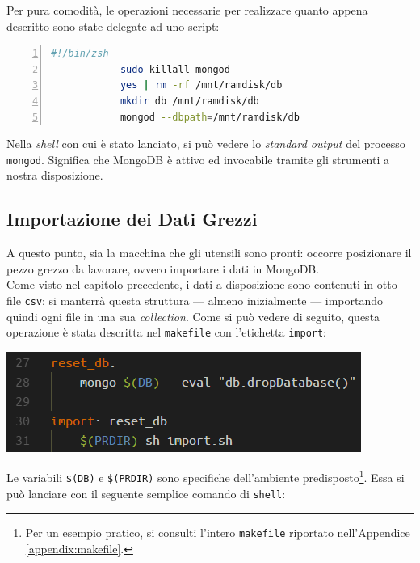 		Per pura comodità, le operazioni necessarie per realizzare quanto appena descritto sono state delegate ad uno script:

		\begin{lstlisting}[language=bash,caption={script di lancio di un server MongoDB}, numbers=left, stepnumber=1]
			#!/bin/zsh
			sudo killall mongod
			yes | rm -rf /mnt/ramdisk/db
			mkdir db /mnt/ramdisk/db
			mongod --dbpath=/mnt/ramdisk/db
		\end{lstlisting}

		\vspace{0.3cm}

		Nella \textit{shell} con cui è stato lanciato, si può vedere lo \textit{standard output} del processo \texttt{mongod}. Significa che MongoDB è attivo ed invocabile tramite gli strumenti a nostra disposizione.

	\subsection{Importazione dei Dati Grezzi}

		A questo punto, sia la macchina che gli utensili sono pronti: occorre posizionare il pezzo grezzo da lavorare, ovvero importare i dati in MongoDB. \\

		Come visto nel capitolo precedente, i dati a disposizione sono contenuti in otto file \texttt{csv}: si manterrà questa struttura --- almeno inizialmente --- importando quindi ogni file in una sua \textit{collection}. Come si può vedere di seguito, questa operazione è stata descritta nel \texttt{makefile} con l'etichetta \texttt{import}:

		\begin{center}
			\includegraphics[scale=0.7]{img/import.png}
		\end{center}

		Le variabili \texttt{\$(DB)} e \texttt{\$(PRDIR)} sono specifiche dell'ambiente predisposto\footnote{Per un esempio pratico, si consulti l'intero \texttt{makefile} riportato nell'Appendice \ref{appendix:makefile}.}. Essa si può lanciare con il seguente semplice comando di \texttt{shell}:

